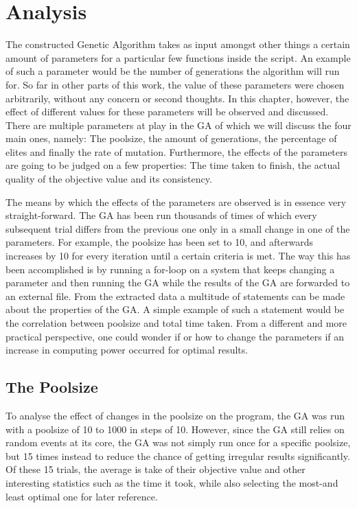 \section{Analysis}

\par
The constructed Genetic Algorithm takes as input amongst other things a certain amount of parameters for a particular few functions inside the script. An example of such a parameter would be the number of generations the algorithm will run for. So far in other parts of this work, the value of these parameters were chosen arbitrarily, without any concern or second thoughts. In this chapter, however, the effect of different values for these parameters will be observed and discussed. 
There are multiple parameters at play in the GA of which we will discuss the four main ones, namely: The poolsize, the amount of generations, the percentage of elites and finally the rate of mutation. Furthermore, the effects of the parameters are going to be judged on a few properties: The time taken to finish, the actual quality of the objective value and its consistency.
\par
The means by which the effects of the parameters are observed is in essence very straight-forward. The GA has been run thousands of times of which every subsequent trial differs from the previous one only in a small change in one of the parameters.
For example, the poolsize has been set to 10, and afterwards increases by 10 for every iteration until a certain criteria is met. The way this has been accomplished is by running a for-loop on a system that keeps changing a parameter and then running the GA while the results of the GA are forwarded to an external file.
From the extracted data a multitude of statements can be made about the properties of the GA. A simple example of such a statement would be the correlation between poolsize and total time taken. From a different and more practical perspective, one could wonder if or how to change the parameters if an increase in computing power occurred for optimal results.


\subsection{The Poolsize}

\par
To analyse the effect of changes in the poolsize on the program, the GA was run with a poolsize of 10 to 1000 in steps of 10. However, since the GA still relies on random events at its core, the GA was not simply run once for a specific poolsize, but 15 times instead to reduce the chance of getting irregular results significantly. Of these 15 trials, the average is take of their objective value and other interesting statistics such as the time it took, while also selecting the most-and least optimal one for later reference.

